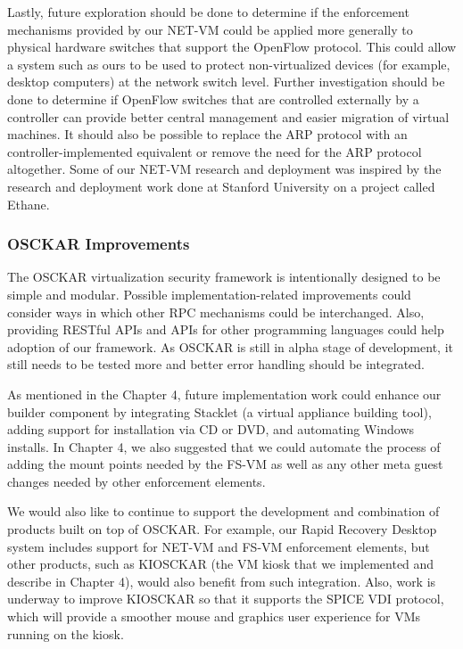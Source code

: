 Lastly, future exploration should be done to determine if the enforcement mechanisms provided by our NET-VM could be applied more generally to physical hardware switches that support the OpenFlow protocol. This could allow a system such as ours to be used to protect non-virtualized devices (for example, desktop computers) at the network switch level. Further investigation should be done to determine if OpenFlow switches that are controlled externally by a controller can provide better central management and easier migration of virtual machines. It should also be possible to replace the ARP protocol with an controller-implemented equivalent or remove the need for the ARP protocol altogether\cite{casado_2007}. Some of our NET-VM research and deployment was inspired by the research and deployment work done at Stanford University on a project called Ethane\cite{casado_2007}.

\subsubsection{OSCKAR Improvements}

The OSCKAR virtualization security framework is intentionally designed to be simple and modular. Possible implementation-related improvements could consider ways in which other RPC mechanisms could be interchanged. Also, providing RESTful APIs and APIs for other programming languages could help adoption of our framework. As OSCKAR is still in alpha stage of development, it still needs to be tested more and better error handling should be integrated.

As mentioned in the Chapter 4, future implementation work could enhance our builder component by integrating Stacklet (a virtual appliance building tool), adding support for installation via CD or DVD, and automating Windows installs. In Chapter 4, we also suggested that we could automate the process of adding the mount points needed by the FS-VM as well as any other meta guest changes needed by other enforcement elements.

We would also like to continue to support the development and combination of products built on top of OSCKAR. For example, our Rapid Recovery Desktop system includes support for NET-VM and FS-VM enforcement elements, but other products, such as KIOSCKAR (the VM kiosk that we implemented and describe in Chapter 4), would also benefit from such integration. Also, work is underway to improve KIOSCKAR so that it supports the SPICE\cite{spice_website} VDI protocol, which will provide a smoother mouse and graphics user experience for VMs running on the kiosk.

